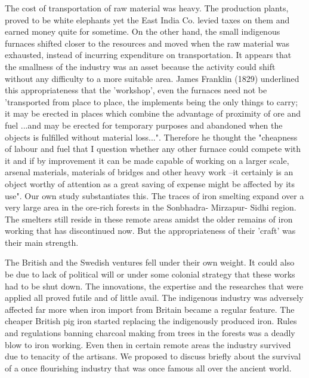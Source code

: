 The cost of transportation of raw material was heavy. The production plants, proved to be white elephants yet the East India Co. levied taxes on them and earned money quite for sometime. On the other hand, the small indigenous furnaces shifted closer to the resources and moved when the raw material was exhausted, instead of incurring expenditure on transportation. It appears that the smallness of the industry was an asset because the activity could shift without any difficulty to a more suitable area. James Franklin (1829) underlined this appropriateness that the 'workshop', even the furnaces need not be 'transported from place to place, the implements being the only things to carry; it may be erected in places which combine the advantage of proximity of ore and fuel ...and may be erected for temporary purposes and abandoned when the objects is fulfilled without material loss...". Therefore he thought the "cheapness of labour and fuel that I question whether any other furnace could compete with it and if by improvement it can be made capable of working on a larger scale, arsenal materials, materials of bridges and other heavy work –it certainly is an object worthy of attention as a great saving of expense might be affected by its use". Our own study substantiates this. The traces of iron smelting expand over a very large area in the ore-rich forests in the Sonbhadra- Mirzapur- Sidhi region. The smelters still reside in these remote areas amidst the older remains of iron working that has discontinued now. But the appropriateness of their 'craft' was their main strength. 

The British and the Swedish ventures fell under their own weight. It could also be due to lack of political will or under some colonial strategy that these works had to be shut down. The innovations, the expertise and the researches that were applied all proved futile and of little avail. The indigenous industry was adversely affected far more when iron import from Britain became a regular feature. The cheaper British pig iron started replacing the indigenously produced iron. Rules and regulations banning charcoal making from trees in the forests was a deadly blow to iron working. Even then in certain remote areas the industry survived due to tenacity of the artisans. We proposed to discuss briefly about the survival of a once flourishing industry that was once famous all over the ancient world.


\theendnotes



